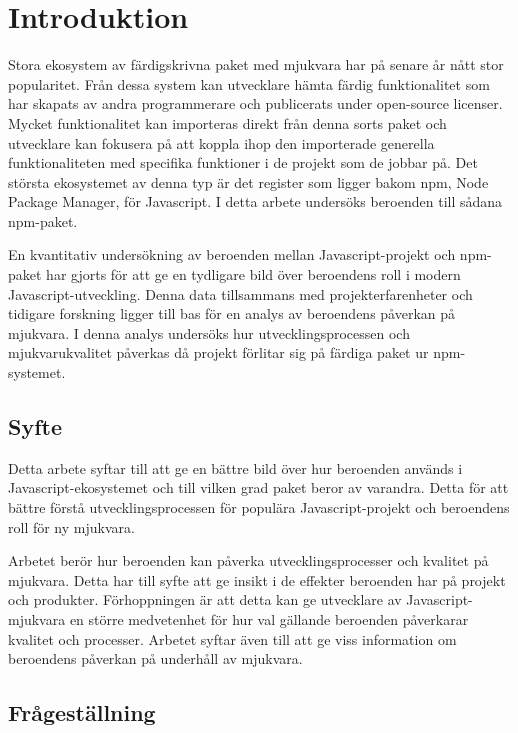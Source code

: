 \section{Introduktion}
\label{sec:joel_o-introduction}
Stora ekosystem av färdigskrivna paket med mjukvara har på senare år nått stor popularitet.\cite{Wittern:2016} Från dessa system kan utvecklare hämta färdig funktionalitet som har skapats av andra programmerare och publicerats under open-source licenser. Mycket funktionalitet kan importeras direkt från denna sorts paket och utvecklare kan fokusera på att koppla ihop den importerade generella funktionaliteten med specifika funktioner i de projekt som de jobbar på. Det största ekosystemet av denna typ är det register som ligger bakom npm, Node Package Manager\cite{Decan2018}, för Javascript. I detta arbete undersöks beroenden till sådana npm-paket.

En kvantitativ undersökning av beroenden mellan Javascript-projekt och npm-paket har gjorts för att ge en tydligare bild över beroendens roll i modern Javascript-utveckling. Denna data tillsammans med projekterfarenheter och tidigare forskning ligger till bas för en analys av beroendens påverkan på mjukvara. I denna analys undersöks hur utvecklingsprocessen och mjukvarukvalitet påverkas då projekt förlitar sig på färdiga paket ur npm-systemet.

\subsection{Syfte}
Detta arbete syftar till att ge en bättre bild över hur beroenden används i Javascript-ekosystemet och till vilken grad paket beror av varandra. Detta för att bättre förstå utvecklingsprocessen för populära Javascript-projekt och beroendens roll för ny mjukvara.

Arbetet berör hur beroenden kan påverka utvecklingsprocesser och kvalitet på mjukvara. Detta har till syfte att ge insikt i de effekter beroenden har på projekt och produkter. Förhoppningen är att detta kan ge utvecklare av Javascript-mjukvara en större medvetenhet för hur val gällande beroenden påverkarar kvalitet och processer. Arbetet syftar även till att ge viss information om beroendens påverkan på underhåll av mjukvara.

\subsection{Frågeställning}
\label{subsec:joel_o-research-questions}

